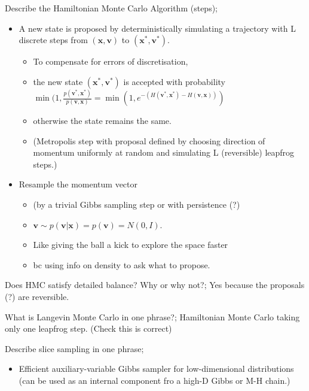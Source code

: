 \documentclass{article}
\begin{document}
Describe the Hamiltonian Monte Carlo Algorithm (steps); \begin{itemize}
    \item A new state is proposed by deterministically simulating a trajectory with L discrete steps from $(\mathbf{x, v})$ to $(\mathbf{x^*, v^*})$. \begin{itemize}
        \item To compensate for errors of discretisation, 
        \item the new state $(\mathbf{x^*, v^*})$ is accepted with probability $\min (1, \frac{p(\mathbf{v^*, x^*})}{p(\mathbf{v, x})}=\min(1, e^{-(H(\mathbf{v^*, x^*})-H(\mathbf{v, x}))})$
        \item otherwise the state remains the same. 
        \item (Metropolis step with proposal defined by choosing direction of momentum uniformly at random and simulating L (reversible) leapfrog steps.) 
    \end{itemize}
    \item Resample the momentum vector \begin{itemize}
        \item (by a trivial Gibbs sampling step or with persistence (?)
        \item $\mathbf{v}\sim p(\mathbf{v|x}) = p(\mathbf{v}) = N(0,I)$.
        \item Like giving the ball a kick to explore the space faster
        \item bc using info on density to ask what to propose.
    \end{itemize}
\end{itemize}

Does HMC satisfy detailed balance? Why or why not?; Yes because the proposals (?) are reversible.

What is Langevin Monte Carlo in one phrase?; Hamiltonian Monte Carlo taking only one leapfrog step. (Check this is correct)


Describe slice sampling in one phrase; \begin{itemize}
    \item Efficient auxiliary-variable Gibbs sampler for low-dimensional distributions (can be used as an internal component fro a high-D Gibbs or M-H chain.)
\end{itemize}
\end{document}

